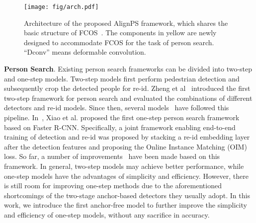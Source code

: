 \documentclass[journal]{IEEEtran}
\begin{document}
\begin{figure*}[t]
\setlength{\abovecaptionskip}{1mm}
\centering
\texttt{[image: fig/arch.pdf]}
\caption{Architecture of the proposed AlignPS framework, which shares the basic structure of FCOS~\cite{DBLP:conf/iccv/TianSCH19}. The components in yellow are newly designed to accommodate FCOS for the task of person search. ``Dconv'' means deformable convolution.}\label{fig:arch}
\vspace{-2mm}
\end{figure*}

\textbf{Person Search}. Existing person search frameworks can be divided into two-step and one-step models. Two-step models first perform pedestrian detection and subsequently crop the detected people for re-id. Zheng et al~\cite{DBLP:conf/cvpr/ZhengZSCYT17} introduced the first two-step framework for person search and evaluated the combinations of different detectors and re-id models. Since then, several models~\cite{DBLP:conf/eccv/ChenZOYT18,DBLP:conf/eccv/LanZG18,DBLP:conf/iccv/HanYZTZGS19,DBLP:conf/cvpr/WangMCSC20} have followed this pipeline. In~\cite{DBLP:conf/cvpr/XiaoLWLW17}, Xiao et al. proposed the first one-step person search framework based on Faster R-CNN. Specifically, a joint framework enabling end-to-end training of detection and re-id was proposed by stacking a re-id embedding layer after the detection features and proposing the Online Instance Matching (OIM) loss. So far, a number of improvements~\cite{DBLP:conf/iccv/LiuFJKZQJY17,DBLP:journals/pr/XiaoXTHWF19,DBLP:conf/eccv/ChangHSLYH18,DBLP:conf/cvpr/YanZNZXY19,DBLP:conf/cvpr/MunjalATG19,DBLP:conf/cvpr/DongZST20a,DBLP:conf/cvpr/ChenZYS20} have been made based on this framework. In general, two-step models may achieve better performance, while one-step models have the advantages of simplicity and efficiency. However, there is still room for improving one-step methods due to the aforementioned shortcomings of the two-stage anchor-based detectors they usually adopt. In this work, we introduce the first anchor-free model to further improve the simplicity and efficiency of one-step models, without any sacrifice in accuracy. 
\end{document}
